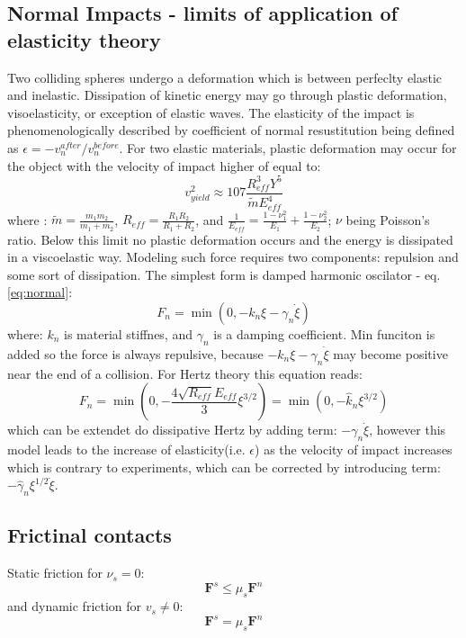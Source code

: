 \documentclass[10pt,a4paper]{article}
\begin{document}
\subsection{Normal Impacts - limits of application of elasticity theory}
Two colliding spheres undergo a deformation which is between perfeclty elastic and inelastic. Dissipation of kinetic energy may go through
plastic deformation, visoelasticity, or exception of elastic waves. 
The elasticity of the impact is phenomenologically described by coefficient of normal resustitution being defined as $\epsilon = -v^{after}_n/v^{before}_n$. 
For two elastic materials, plastic deformation may occur for the object with the velocity of impact higher of equal to:
\begin{equation} \label{eq:impact}
 v^2_{yield} \approx 107 \frac{R^3_{eff} Y^5}{\tilde{m} E^4_{eff}}
\end{equation}
where : $\tilde{m} = \frac{m_1m_2}{m_1 + m_2}$, $R_{eff} = \frac{R_1R_2}{R_1 + R_2}$, and $\frac{1}{E_{eff}} = \frac{1-\nu^2_1}{E_1} +\frac{1-\nu^2_2}{E_2}$; 
$\nu$ being Poisson's ratio. Below this limit no plastic deformation occurs and the energy is dissipated in a viscoelastic way.
Modeling such force requires two components: repulsion and some sort of dissipation. The simplest form is damped harmonic oscilator - eq.\ref{eq:normal}:
\begin{equation}
 F_{n} = \min(0,-k_n\xi - \gamma_n \dot{\xi})
\end{equation}
where: $k_n$ is material stiffnes, and $\gamma_n$ is a damping coefficient. Min funciton is added so the force is always repulsive,
because $-k_n\xi - \gamma_n \dot{\xi}$ may become positive near the end of a collision.
For Hertz theory this equation reads:
\begin{equation}
 F_{n} = \min \left(0, -\frac{4 \sqrt{R_{eff}} E_{eff}}{3} \xi^{3/2} \right)  =  \min(0, -\hat{k}_{n}\xi^{3/2})
\end{equation}
which can be extendet do dissipative Hertz by adding term: $- \gamma_n \dot{\xi}$, however this model leads to the increase of
elasticity(i.e. $\epsilon$) as the velocity of impact increases which is contrary to experiments, which can be corrected by 
introducing term: $ -\hat{\gamma}_n \xi^{1/2} \dot{\xi}$.



\subsection{Frictinal contacts}
Static friction for $\nu_s = 0$:
\begin{equation}
 \mathbf{F}^s \le \mu_s \mathbf{F}^n
\end{equation}
and dynamic friction for $v_s \ne 0$:
\begin{equation}
 \mathbf{F}^s = \mu_s \mathbf{F}^n
\end{equation}
\end{document}
